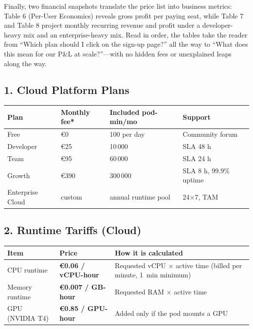 \documentclass[11pt, a4paper, oneside]{article}
\begin{document}
Finally, two financial snapshots translate the price list into business metrics: Table 6 (Per-User Economics) reveals gross profit per paying seat, while Table 7 and Table 8 project monthly recurring revenue and profit under a developer-heavy mix and an enterprise-heavy mix. Read in order, the tables take the reader from “Which plan should I click on the sign-up page?” all the way to “What does this mean for our P\&L at scale?”—with no hidden fees or unexplained leaps along the way.

\subsection*{1. Cloud Platform Plans}
\begin{center}
\begin{tabular}{@{}llll@{}}
\toprule
\textbf{Plan} & \textbf{Monthly fee*} & \textbf{Included pod-min/mo} & \textbf{Support} \\
\midrule
Free & €0 & 100 per day & Community forum \\
Developer & €25 & 10\,000 & SLA 48 h \\
Team & €95 & 60\,000 & SLA 24 h \\
Growth & €390 & 300\,000 & SLA 8 h, 99.9\% uptime \\
Enterprise Cloud & custom & annual runtime pool & 24×7, TAM \\
\bottomrule
\end{tabular}
\end{center}

\subsection*{2. Runtime Tariffs (Cloud)}
\begin{center}
\begin{tabular}{@{}p{4cm}p{4cm}p{6cm}@{}}
\toprule
\textbf{Item} & \textbf{Price} & \textbf{How it is calculated} \\
\midrule
CPU runtime & \textbf{€0.06 / vCPU-hour} & Requested vCPU $\times$ active time (billed per minute, 1~min minimum) \\
Memory runtime & \textbf{€0.007 / GB-hour} & Requested RAM $\times$ active time \\
GPU (NVIDIA T4) & \textbf{€0.85 / GPU-hour} & Added only if the pod mounts a GPU \\
\bottomrule
\end{tabular}
\end{center}
\end{document}
